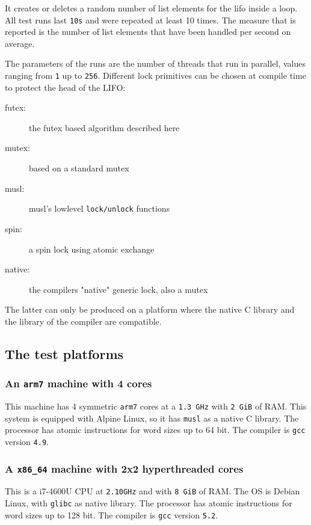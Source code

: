 \documentclass{sig-alternate-05-2015}
\begin{document}
It creates or deletes a random number of list elements for the lifo
inside a loop. All test runs last \texttt{10s} and were repeated at least
10 times. The measure that is reported is the number of list
elements that have been handled per second on average.

The parameters of the runs are the number of threads that run in
parallel, values ranging from \texttt{1} up to \texttt{256}.  Different lock
primitives can be chosen at compile time to protect the head of the
LIFO:\vspace*{-1ex}

\begin{description}
\item[{futex:}] the futex based algorithm described here
\item[{mutex:}] based on a standard mutex
\item[{musl:}] musl's lowlevel \texttt{lock/unlock} functions
\item[{spin:}] a spin lock using atomic exchange
\item[{native:}] the compilers "native" generic lock, also a mutex
\end{description}

The latter can only be produced on a platform where the native C
library and the library of the compiler are compatible.

\subsection{The test platforms}
\label{sec-4-3}

\subsubsection{An \texttt{arm7} machine with 4 cores}
\label{sec-4-3-1}

This machine has 4 symmetric \texttt{arm7} cores at a \texttt{1.3 GHz} with \texttt{2
    GiB} of RAM. This system is equipped with Alpine Linux, so it has
\texttt{musl} as a native C library. The processor has atomic
instructions for word sizes up to 64 bit. The compiler is \texttt{gcc}
version \texttt{4.9}.

\subsubsection{A \texttt{x86\_64} machine with 2x2 hyperthreaded cores}
\label{sec-4-3-2}

This is a i7-4600U CPU at \texttt{2.10GHz} and with \texttt{8 GiB} of RAM. The
OS is Debian Linux, with \texttt{glibc} as native library.  The processor
has atomic instructions for word sizes up to 128 bit. The compiler
is \texttt{gcc} version \texttt{5.2}.
\end{document}
